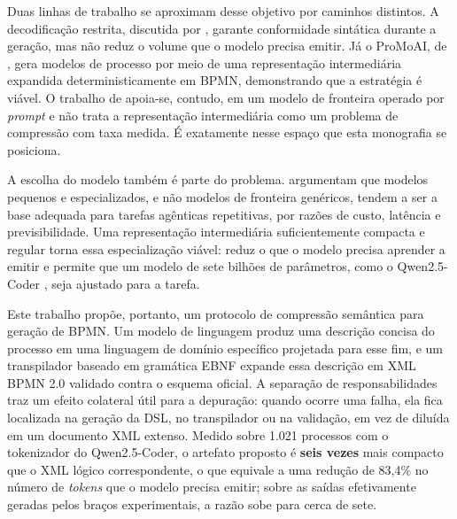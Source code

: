 Duas linhas de trabalho se aproximam desse objetivo por caminhos distintos. A decodificação restrita, discutida por , garante conformidade sintática durante a geração, mas não reduz o volume que o modelo precisa emitir. Já o ProMoAI, de , gera modelos de processo por meio de uma representação intermediária expandida deterministicamente em BPMN, demonstrando que a estratégia é viável. O trabalho de  apoia-se, contudo, em um modelo de fronteira operado por \textit{prompt} e não trata a representação intermediária como um problema de compressão com taxa medida. É exatamente nesse espaço que esta monografia se posiciona.

A escolha do modelo também é parte do problema.  argumentam que modelos pequenos e especializados, e não modelos de fronteira genéricos, tendem a ser a base adequada para tarefas agênticas repetitivas, por razões de custo, latência e previsibilidade. Uma representação intermediária suficientemente compacta e regular torna essa especialização viável: reduz o que o modelo precisa aprender a emitir e permite que um modelo de sete bilhões de parâmetros, como o Qwen2.5-Coder \cite{hui2024qwen25coder}, seja ajustado para a tarefa.

Este trabalho propõe, portanto, um protocolo de compressão semântica para geração de BPMN. Um modelo de linguagem produz uma descrição concisa do processo em uma linguagem de domínio específico projetada para esse fim, e um transpilador baseado em gramática EBNF expande essa descrição em XML BPMN 2.0 validado contra o esquema oficial. A separação de responsabilidades traz um efeito colateral útil para a depuração: quando ocorre uma falha, ela fica localizada na geração da DSL, no transpilador ou na validação, em vez de diluída em um documento XML extenso. Medido sobre 1.021 processos com o tokenizador do Qwen2.5-Coder, o artefato proposto é \textbf{seis vezes} mais compacto que o XML lógico correspondente, o que equivale a uma redução de 83,4\% no número de \textit{tokens} que o modelo precisa emitir; sobre as saídas efetivamente geradas pelos braços experimentais, a razão sobe para cerca de sete.

